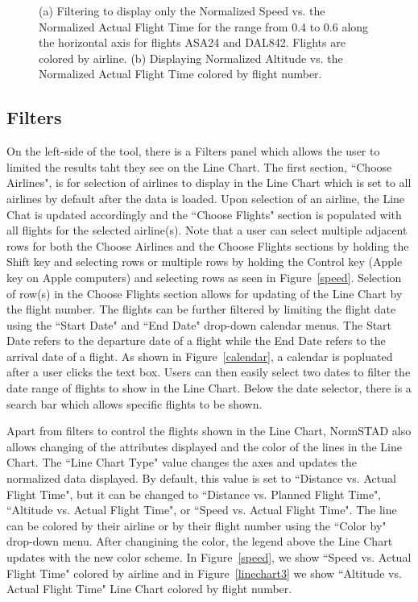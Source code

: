 \documentclass{sig-alternate}
\begin{document}
\begin{figure}
\centering
{}\hfill
{}
\caption{
(a) Filtering to display only the Normalized Speed vs. the Normalized Actual Flight Time for the range from 0.4 to 0.6 along the horizontal axis for flights ASA24 and DAL842. Flights are colored by airline.
(b) Displaying Normalized Altitude vs. the Normalized Actual Flight Time colored by flight number.}
\label{lines}
\end{figure}
 
\subsection{Filters}
\label{subsec-filters}

On the left-side of the tool, there is a Filters panel which allows the user
to limited the results taht they see on the Line Chart. The first section,
``Choose Airlines", is for selection of airlines to display in the 
Line Chart which is set to all airlines by default after the data is loaded.
Upon selection of an airline, the Line Chat is updated accordingly and 
the ``Choose Flights" section is populated with all flights
for the selected airline(s). Note that a user can select
multiple adjacent rows for both the Choose Airlines and the Choose Flights
sections by holding the Shift key and selecting rows or multiple rows
by holding the Control key (Apple key on Apple computers) and selecting rows as 
seen in Figure~\ref{speed}.
Selection of row(s) in the Choose Flights section allows for updating 
of the Line Chart by the flight number. The flights can be further filtered 
by limiting the flight date using the ``Start Date" and ``End Date" drop-down 
calendar menus. The Start Date refers to the departure date of a flight
while the End Date refers to the arrival date of a flight. As shown in
Figure~\ref{calendar}, a calendar is popluated after a user clicks the text box.
Users can then easily select two dates to filter the date range of flights 
to show in the Line Chart. Below the date selector, there is a search bar which 
allows specific flights to be shown.


Apart from filters to control the flights shown in the Line Chart, NormSTAD also allows changing
of the attributes displayed and the color of the lines in the Line Chart. The ``Line Chart Type"
value changes the axes and updates the normalized data displayed. By default, this value
is set to ``Distance vs. Actual Flight Time", but it can be changed to ``Distance
vs. Planned Flight Time", ``Altitude vs. Actual Flight Time", or ``Speed vs. Actual Flight Time". 
The line can be colored by their airline or by their flight number using the ``Color by" drop-down
menu. After changining the color, the legend above the Line Chart updates with the new 
color scheme. In Figure~\ref{speed}, we show ``Speed vs. Actual Flight Time" colored by
airline and in
Figure~\ref{linechart3} we show
``Altitude vs. Actual Flight Time" Line Chart colored by flight number. 
\end{document}
